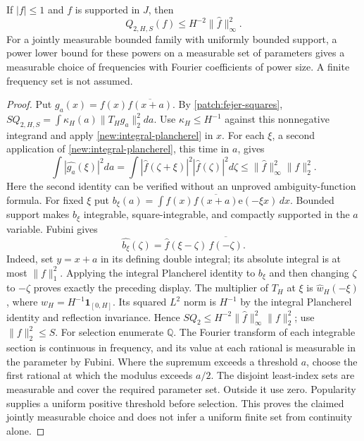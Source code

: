 \documentclass[11pt]{article}
\theoremstyle{definition}
\newcommand{\ee}[1]{\mathrm e\!\left(#1\right)}
\begin{document}
\begin{lemma}
\label{patch:u2-fourier-selection}
If $|f|\leq1$ and $f$ is supported in $J$, then
\[
 Q_{2,H,S}(f)\leq H^{-2}\|\widehat f\|_\infty^2.
\]
For a jointly measurable bounded family with uniformly bounded support, a power lower bound
for these powers on a measurable set of parameters gives a measurable choice of frequencies
with Fourier coefficients of power size.  A finite frequency set is not assumed.
\end{lemma}
\begin{proof}
Put $g_a(x)=f(x)\overline{f(x+a)}$.  By \cref{patch:fejer-squares},
$SQ_{2,H,S}=\int\kappa_H(a)\|T_Hg_a\|_2^2da$.
Use $\kappa_H\leq H^{-1}$ against this nonnegative integrand and apply \cref{new:integral-plancherel} in $x$.
For each $\xi$, a second application of \cref{new:integral-plancherel}, this time in $a$, gives
\[
 \int|\widehat{g_a}(\xi)|^2da
    =\int|\widehat f(\zeta+\xi)|^2|\widehat f(\zeta)|^2d\zeta
    \leq\|\widehat f\|_\infty^2\|f\|_2^2.
\]
Here the second identity can be verified without an unproved ambiguity-function formula.
For fixed $\xi$ put $b_\xi(a)=\int f(x)\overline{f(x+a)}\ee{-\xi x}\,dx$.
Bounded support makes $b_\xi$ integrable, square-integrable, and compactly supported in the
$a$ variable. Fubini gives
\[
 \widehat {b_\xi}(\zeta)=\widehat f(\xi-\zeta)\,
                                  \overline{\widehat f(-\zeta)}.
\]
Indeed, set $y=x+a$ in its defining double integral; its absolute integral is at most
$\|f\|_1^2$. Applying the integral Plancherel identity to $b_\xi$ and then changing
$\zeta$ to $-\zeta$ proves exactly the preceding display.
The multiplier of $T_H$ at $\xi$ is $\widehat w_H(-\xi)$, where
$w_H=H^{-1}\mathbf1_{[0,H]}$. Its squared $L^2$ norm is $H^{-1}$ by the integral
Plancherel identity and reflection invariance.  Hence $SQ_2\leq H^{-2}\|\widehat f\|_\infty^2\|f\|_2^2$;
use $\|f\|_2^2\leq S$.
For selection enumerate $\mathbb Q$.  The Fourier transform of each integrable section is
continuous in frequency, and its value at each rational is measurable in the parameter by
Fubini.  Where the supremum exceeds a threshold $a$, choose the first rational at which the
modulus exceeds $a/2$.  The disjoint least-index sets are measurable and cover the required
parameter set.  Outside it use zero.  Popularity supplies a uniform positive threshold
before selection.  This proves the claimed jointly measurable choice and does not infer a
uniform finite set from continuity alone.
\end{proof}
\end{document}
